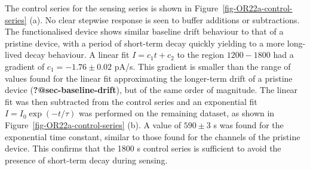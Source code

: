 \documentclass[
  a4paper,
]{scrbook}
\begin{document}
The control series for the sensing series is shown in
Figure~\ref{fig-OR22a-control-series} (a). No clear stepwise response is
seen to buffer additions or subtractions. The functionalised device
shows similar baseline drift behaviour to that of a pristine device,
with a period of short-term decay quickly yielding to a more long-lived
decay behaviour. A linear fit \(I = c_1t + c_2\) to the region
\(1200-1800\) had a gradient of \(c_1 = -1.76\pm0.02\) pA/s. This
gradient is smaller than the range of values found for the linear fit
approximating the longer-term drift of a pristine device
(\textbf{?@sec-baseline-drift}), but of the same order of magnitude. The
linear fit was then subtracted from the control series and an
exponential fit \(I = I_0\exp(-t/\tau)\) was performed on the remaining
dataset, as shown in Figure~\ref{fig-OR22a-control-series} (b). A value
of \(590 \pm 3\) s was found for the exponential time constant, similar
to those found for the channels of the pristine device. This confirms
that the 1800 s control series is sufficient to avoid the presence of
short-term decay during sensing.
\end{document}
